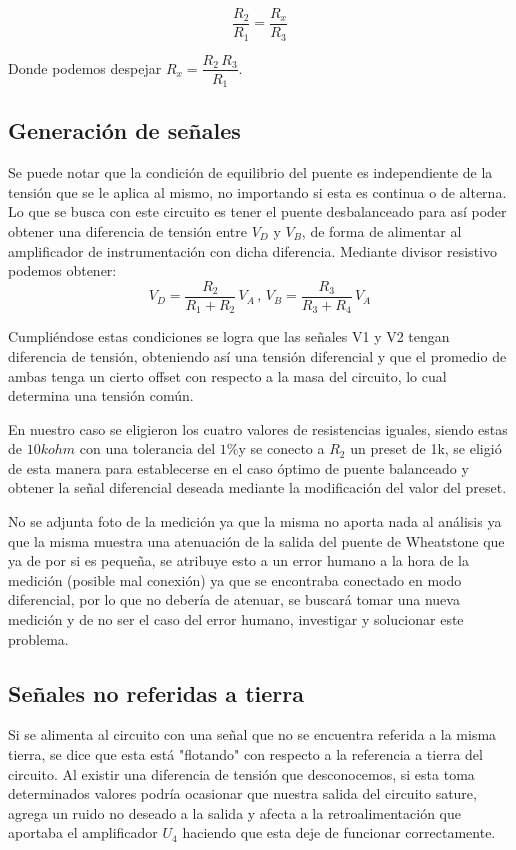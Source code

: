 \begin{equation}
\dfrac{R_2}{R_1} = \dfrac{R_x}{R_3}
\label{eq:EqPuente}
\end{equation}
	
	Donde podemos despejar $R_x = \dfrac{R_2 \, R_3}{R_1}$.
	
\subsection{Generación de señales}
	Se puede notar que la condición de equilibrio del puente es independiente de la tensión que se le aplica al mismo, no importando si esta es continua o de alterna.
	Lo que se busca con este circuito es tener el puente desbalanceado para así poder obtener una diferencia de tensión entre $V_D$ y $V_B$, de forma de alimentar al amplificador de instrumentación con dicha diferencia.
	Mediante divisor resistivo podemos obtener:
\begin{equation}
	V_D= \dfrac{R_2}{R_1+R_2} \, V_A \, , \, V_B = \dfrac{R_3}{R_3+R_4} \, V_A
\end{equation}

	Cumpliéndose estas condiciones se logra que las señales V1 y V2 tengan diferencia
de tensión, obteniendo así una tensión diferencial y que el promedio de ambas tenga un cierto offset con respecto a la masa del circuito, lo cual determina una tensión común. 
	
	En nuestro caso se eligieron los cuatro valores de resistencias iguales, siendo estas de $10k\si{ohm}$  con una tolerancia del $1\%$y se conecto a $R_2$ un preset de 1k, se eligió de esta manera para establecerse en el caso óptimo de puente balanceado y obtener la señal diferencial deseada mediante la modificación del valor del preset.
	
	No se adjunta foto de la medición ya que la misma no aporta nada al análisis ya que la misma muestra una atenuación de la salida del puente de Wheatstone que ya de por si es pequeña, se atribuye esto a un error humano a la hora de la medición (posible mal conexión) ya que se encontraba conectado en modo diferencial, por lo que no debería de atenuar, se buscará tomar una nueva medición y de no ser el caso del error humano, investigar y solucionar este problema.
	
\subsection{Señales no referidas a tierra}
	Si se alimenta al circuito con una señal que no se encuentra referida a la misma tierra, se dice que esta está "flotando" con respecto a la referencia a tierra del circuito. Al existir una diferencia de tensión que desconocemos, si esta toma determinados valores podría ocasionar que nuestra salida del circuito sature, agrega un ruido no deseado a la salida y afecta a la retroalimentación que aportaba el amplificador $\mathit{U_4}$ haciendo que esta deje de funcionar correctamente.







